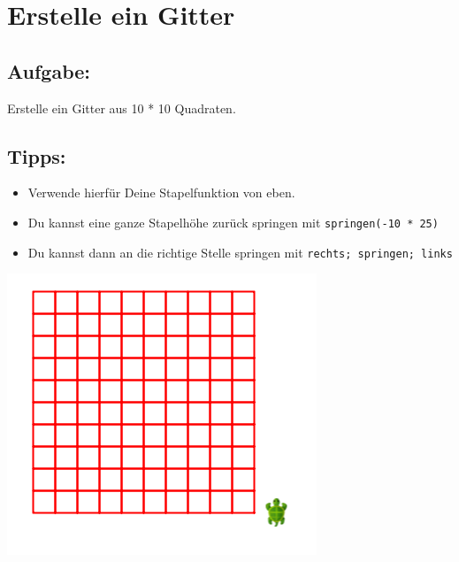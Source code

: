 \chapter{Erstelle ein Gitter}
\begin{multicols}{2}
\section*{\color{BrickRed}Aufgabe:}
Erstelle ein Gitter aus 10 * 10 Quadraten.
\section*{\color{OliveGreen}Tipps:}


\begin{itemize}

\item {Verwende hierfür Deine Stapelfunktion von eben.}
\item {Du kannst eine ganze Stapelhöhe zurück springen mit \lstinline{springen(-10 * 25)}}
\item {Du kannst dann an die richtige Stelle springen mit \lstinline{rechts; springen; links}}

\end{itemize}



\columnbreak

\begin{center}
\includegraphics{../img/square-grid.png}
\end{center}

\end{multicols}

